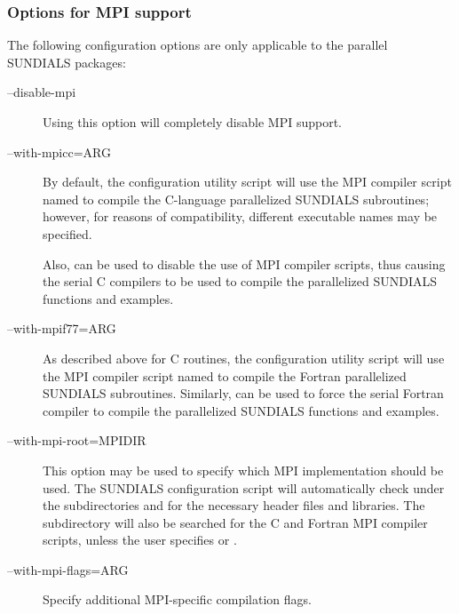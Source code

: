 \documentclass[letterpaper,10pt,english]{sphinxmanual}
\begin{document}
\subsubsection{Options for MPI support}
\label{Install:options-for-mpi-support}
The following configuration options are only applicable to the
parallel SUNDIALS packages:
\begin{description}
\item[{--disable-mpi}] \leavevmode
Using this option will completely disable MPI support.

\item[{--with-mpicc=ARG}] \leavevmode
By default, the configuration utility script will
use the MPI compiler script named  to compile the
C-language parallelized SUNDIALS subroutines; however, for reasons
of compatibility, different executable names may be specified.

Also,  can be used to disable the use of MPI
compiler scripts, thus causing the serial C compilers to be used to
compile the parallelized SUNDIALS functions and examples.

\item[{--with-mpif77=ARG}] \leavevmode
As described above for C routines, the configuration utility script
will use the MPI compiler script named  to compile the
Fortran parallelized SUNDIALS subroutines.  Similarly,
 can be used to force the serial Fortran
compiler to compile the parallelized SUNDIALS functions and
examples.

\item[{--with-mpi-root=MPIDIR}] \leavevmode
This option may be used to specify which MPI implementation should
be used. The SUNDIALS configuration script will automatically check
under the subdirectories  and  for
the necessary header files and libraries.  The subdirectory
 will also be searched for the C and Fortran MPI
compiler scripts, unless the user specifies  or
.

\item[{--with-mpi-flags=ARG}] \leavevmode
Specify additional MPI-specific compilation flags.

\end{description}
\end{document}
